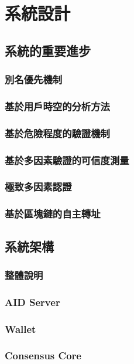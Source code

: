 
\chapter{系統設計}

\section{系統的重要進步}
\subsection{別名優先機制}
\subsection{基於用戶時空的分析方法}
\subsection{基於危險程度的驗證機制}
\subsection{基於多因素驗證的可信度測量}
\subsection{極致多因素認證}
\subsection{基於區塊鏈的自主轉址}

\section{系統架構}
\subsection{整體說明}
\subsection{AID Server}
\subsection{Wallet}
\subsection{Consensus Core}

